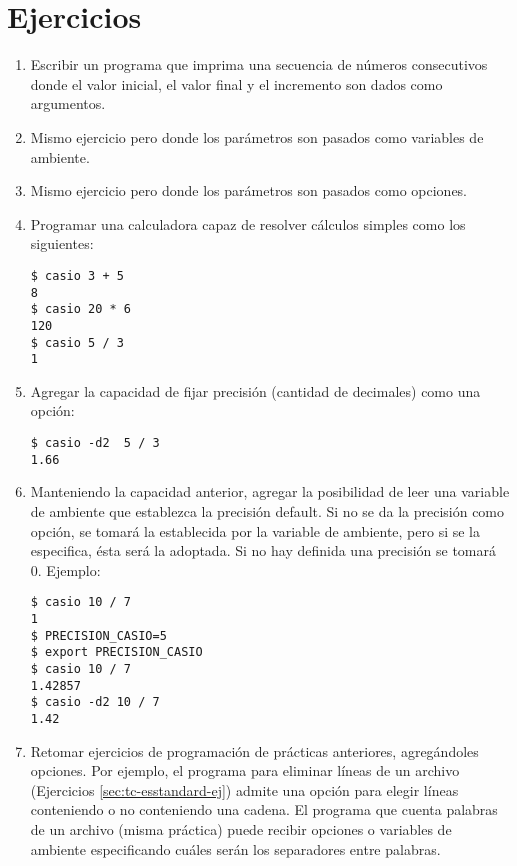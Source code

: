 \section{Ejercicios}
\label{sec:ambienteej}
\begin{enumerate}
\item Escribir un programa que imprima una secuencia de números consecutivos donde
el valor inicial, el valor final y el incremento son dados como argumentos.
\item Mismo ejercicio pero donde los parámetros son pasados como variables de
ambiente.
\item Mismo ejercicio pero donde los parámetros son pasados como opciones.
\item Programar una calculadora capaz de resolver cálculos simples como los
siguientes:
\begin{lstlisting}
$ casio 3 + 5
8
$ casio 20 * 6
120
$ casio 5 / 3
1
\end{lstlisting}
\item Agregar la capacidad de fijar precisión (cantidad de decimales) como una
opción:
\begin{lstlisting}
$ casio -d2  5 / 3
1.66
\end{lstlisting}
\item Manteniendo la capacidad anterior, agregar la posibilidad de leer una
variable de ambiente que establezca la precisión default. Si no se da la
precisión como opción, se tomará la establecida por la variable de ambiente,
pero si se la especifica, ésta será la adoptada. Si no hay definida una
precisión se tomará 0. Ejemplo:
\begin{lstlisting}
$ casio 10 / 7
1
$ PRECISION_CASIO=5
$ export PRECISION_CASIO
$ casio 10 / 7
1.42857
$ casio -d2 10 / 7
1.42
\end{lstlisting}
\item Retomar ejercicios de programación de prácticas anteriores, agregándoles opciones. Por ejemplo, el programa para eliminar líneas de un archivo (Ejercicios \ref{sec:tc-esstandard-ej}) admite una opción para elegir líneas conteniendo o no conteniendo una cadena. El programa que cuenta palabras de un archivo (misma práctica) puede recibir opciones o variables de ambiente especificando cuáles serán los separadores entre palabras.
\end{enumerate}
